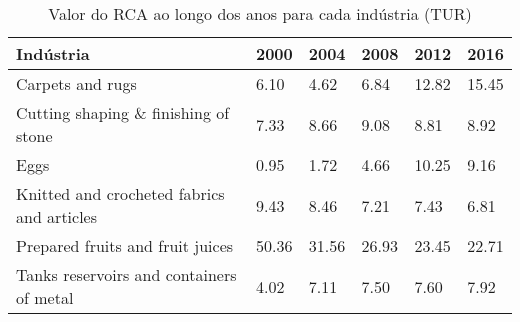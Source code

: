 \begin{table}
\centering
\caption{Valor do RCA ao longo dos anos para cada indústria (TUR)}
\begin{tabular}{p{6cm}p{1.5cm}p{1.5cm}p{1.5cm}p{1.5cm}p{1.5cm}}
\toprule
                                 Indústria &  2000 &  2004 &  2008 &  2012 &  2016 \\
\midrule
                          Carpets and rugs &  6.10 &  4.62 &  6.84 & 12.82 & 15.45 \\
      Cutting shaping \& finishing of stone &  7.33 &  8.66 &  9.08 &  8.81 &  8.92 \\
                                      Eggs &  0.95 &  1.72 &  4.66 & 10.25 &  9.16 \\
Knitted and crocheted fabrics and articles &  9.43 &  8.46 &  7.21 &  7.43 &  6.81 \\
          Prepared fruits and fruit juices & 50.36 & 31.56 & 26.93 & 23.45 & 22.71 \\
  Tanks reservoirs and containers of metal &  4.02 &  7.11 &  7.50 &  7.60 &  7.92 \\
\bottomrule
\end{tabular}
\end{table}
